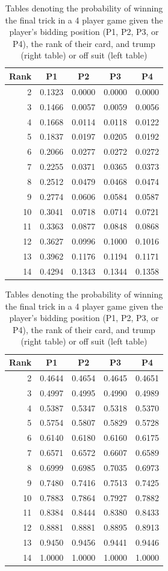 \documentclass{article}
\begin{document}
\begin{table}[h]
\centering
\caption{Tables denoting the probability of winning the final trick in a 4 player game given the player's bidding position (P1, P2, P3, or P4), the rank of their card, and trump (right table) or off suit (left table)}
\label{tab:oneTrickProbs}
\begin{minipage}{0.48\textwidth}
\centering
\begin{tabular}{r|cccc}
\hline
Rank & P1 & P2 & P3 & P4 \\
\hline
2  & 0.1323 & 0.0000 & 0.0000 & 0.0000 \\
3  & 0.1466 & 0.0057 & 0.0059 & 0.0056 \\
4  & 0.1668 & 0.0114 & 0.0118 & 0.0122 \\
5  & 0.1837 & 0.0197 & 0.0205 & 0.0192 \\
6  & 0.2066 & 0.0277 & 0.0272 & 0.0272 \\
7  & 0.2255 & 0.0371 & 0.0365 & 0.0373 \\
8  & 0.2512 & 0.0479 & 0.0468 & 0.0474 \\
9  & 0.2774 & 0.0606 & 0.0584 & 0.0587 \\
10 & 0.3041 & 0.0718 & 0.0714 & 0.0721 \\
11 & 0.3363 & 0.0877 & 0.0848 & 0.0868 \\
12 & 0.3627 & 0.0996 & 0.1000 & 0.1016 \\
13 & 0.3962 & 0.1176 & 0.1194 & 0.1171 \\
14 & 0.4294 & 0.1343 & 0.1344 & 0.1358 \\
\hline
\end{tabular}
\end{minipage}
\hfill
\begin{minipage}{0.48\textwidth}
\centering
\begin{tabular}{r|cccc}
\hline
Rank & P1 & P2 & P3 & P4 \\
\hline
2  & 0.4644 & 0.4654 & 0.4645 & 0.4651 \\
3  & 0.4997 & 0.4995 & 0.4990 & 0.4989 \\
4  & 0.5387 & 0.5347 & 0.5318 & 0.5370 \\
5  & 0.5754 & 0.5807 & 0.5829 & 0.5728 \\
6  & 0.6140 & 0.6180 & 0.6160 & 0.6175 \\
7  & 0.6571 & 0.6572 & 0.6607 & 0.6589 \\
8  & 0.6999 & 0.6985 & 0.7035 & 0.6973 \\
9  & 0.7480 & 0.7416 & 0.7513 & 0.7425 \\
10 & 0.7883 & 0.7864 & 0.7927 & 0.7882 \\
11 & 0.8384 & 0.8444 & 0.8380 & 0.8433 \\
12 & 0.8881 & 0.8881 & 0.8895 & 0.8913 \\
13 & 0.9450 & 0.9456 & 0.9441 & 0.9446 \\
14 & 1.0000 & 1.0000 & 1.0000 & 1.0000 \\
\hline
\end{tabular}
\end{minipage}
\end{table}
\end{document}
